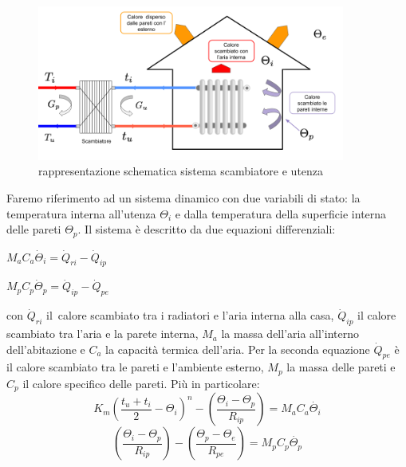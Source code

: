 \documentclass[laurea,oneside,11pt]{USiena_tesiLM}
\begin{document}
\begin{figure}[h]
\begin{center}
\includegraphics[width=0.9\textwidth]{figure/scamb_utenza} %
\caption{rappresentazione schematica sistema scambiatore e utenza}
\label{fig:scamb_utenza}
\end{center}
\end{figure}

Faremo riferimento ad un sistema dinamico con due variabili di stato: la temperatura interna all'utenza  $\Theta_i$  e dalla temperatura della superficie interna delle pareti  $\Theta_p$. Il sistema è  descritto  da due equazioni differenziali:
\begin{center}
$M_aC_a \dot{\Theta}_i = \dot{Q}_{ri} - \dot{Q}_{ip}$ 
\end{center}
\begin{center}
$M_pC_p \dot{\Theta}_p = \dot{Q}_{ip} - \dot{Q}_{pe}$
\end{center}
con $\dot{Q}_{ri}$ il\ calore scambiato tra i radiatori e l'aria interna alla casa, $\dot{Q}_{ip}$ il calore scambiato tra l'aria e la parete interna, $M_a$ la massa dell'aria all'interno dell'abitazione e $C_a$ la capacità termica dell'aria. Per la seconda equazione $ \dot{Q}_{pe}$ è il calore scambiato tra le pareti e l'ambiente esterno, $M_p$ la massa delle pareti e $C_p$ il calore specifico delle pareti.
Più in particolare:
\begin{equation}
K_m\left(\frac{t_u + t_i}{2} - \Theta_{i}\right)^n - \left(\frac{\Theta_{i} - \Theta_p}{R_{ip}}\right) = M_aC_a \dot{\Theta_i}
\end{equation}
\begin{equation}
\left(\frac{\Theta_{i} - \Theta_p}{R_{ip}}\right) - \left(\frac{\Theta_{p} - \Theta_e}{R_{pe}}\right) = M_pC_p \dot{\Theta_p}
\end{equation}
\end{document}
